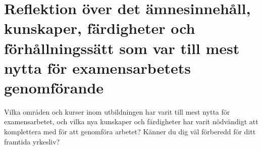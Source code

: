 \documentclass[11pt]{article}
\begin{document}
\section*{Reflektion över det ämnesinnehåll, kunskaper, färdigheter och förhållningssätt som var till mest nytta för examensarbetets genomförande}

Vilka områden och kurser inom utbildningen har varit till mest nytta för examensarbetet, och vilka nya kunskaper och färdigheter har varit nödvändigt att komplettera med för att genomföra arbetet? Känner du dig väl förberedd för ditt framtida yrkesliv? 
\end{document}
